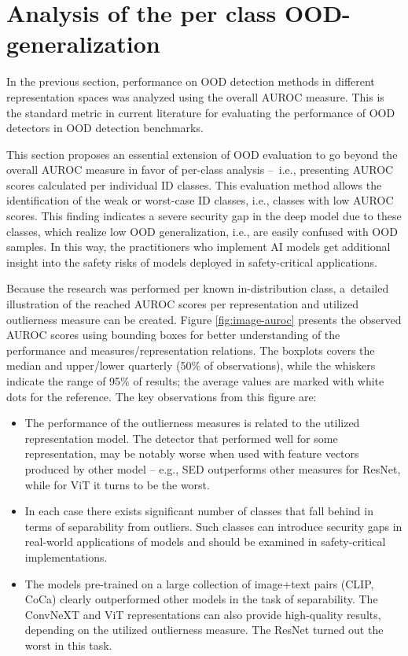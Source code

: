 \section{Analysis of the per class OOD-generalization}
\label{section:real-separability}

In the previous section, performance on OOD detection methods in different representation spaces was analyzed using the overall AUROC measure. This is the standard metric in current literature for evaluating the performance of OOD detectors in OOD detection benchmarks.

This section proposes an essential extension of OOD evaluation to go beyond the overall AUROC measure in favor of per-class analysis –~i.e., presenting AUROC scores calculated per individual ID classes. This evaluation method allows the identification of the weak or worst-case ID classes, i.e., classes with low AUROC scores. This finding indicates a severe security gap in the deep model due to these classes, which realize low OOD generalization, i.e., are easily confused with OOD samples. In this way, the practitioners who implement AI models get additional insight into the safety risks of models deployed in safety-critical applications.

Because the research was performed per known in-distribution class, a~detailed illustration of the reached AUROC scores per representation and utilized outlierness measure can be created. Figure \ref{fig:image-auroc} presents the observed AUROC scores using bounding boxes for better understanding of the performance and measures/representation relations. The boxplots covers the median and upper/lower quarterly (50\% of observations), while the whiskers indicate the range of 95\% of results; the average values are marked with white dots for the reference. The key observations from this figure are:
\vspace{-0.5\baselineskip}
\begin{itemize}
    \item The performance of the outlierness measures is related to the utilized representation model. The detector that performed well for some representation, may be notably worse when used with feature vectors produced by other model – e.g., SED outperforms other measures for ResNet, while for ViT it turns to be the worst.
    \item In each case there exists significant number of classes that fall behind in terms of separability from outliers. Such classes can introduce security gaps in real-world applications of models and should be examined in safety-critical implementations.
    \item The models pre-trained on a large collection of image+text pairs (CLIP, CoCa) clearly outperformed other models in the task of separability. The ConvNeXT and ViT representations can also provide high-quality results, depending on the utilized outlierness measure. The ResNet turned out the worst in this task.
\end{itemize}

